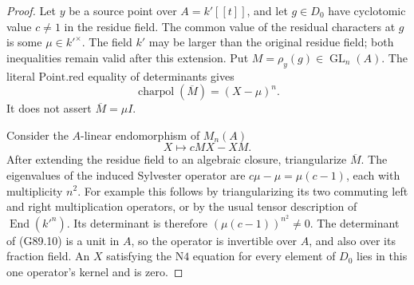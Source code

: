 \begin{proof}
Let \(y\) be a source point over \(A=k'[[t]]\), and let
\(g\in D_0\) have cyclotomic value \(c\ne1\) in the residue field.
The common value of the residual characters at \(g\) is some
\(\mu\in k'^\times\).
The field \(k'\) may be larger than the original residue field;
both inequalities remain valid after this extension.
Put \(M=\rho_y(g)\in\operatorname{GL}_n(A)\).
The literal \(\mathrm{Point.red}\) equality of determinants gives
\[
                  \operatorname{charpol}(\overline M)
                        =(X-\mu)^n.               \tag{G89.9}
\]
It does not assert \(\overline M=\mu I\).

Consider the \(A\)-linear endomorphism of \(M_n(A)\)
\[
                     X\longmapsto cMX-XM.         \tag{G89.10}
\]
After extending the residue field to an algebraic closure,
triangularize \(\overline M\).
The eigenvalues of the induced Sylvester operator are
\(c\mu-\mu=\mu(c-1)\), each with multiplicity \(n^2\).
For example this follows by triangularizing its two commuting
left and right multiplication operators, or by the usual
tensor description of \(\operatorname{End}(k'^n)\).
Its determinant is therefore
\((\mu(c-1))^{n^2}\ne0\).
The determinant of (G89.10) is a unit in \(A\), so the operator
is invertible over \(A\), and also over its fraction field.
An \(X\) satisfying the \(\mathrm{N4}\) equation for every
element of \(D_0\) lies in this one operator's kernel and is zero.
\end{proof}

